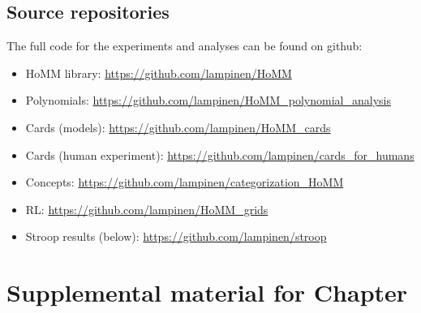 \section{Source repositories}
The full code for the experiments and analyses can be found on github:
\begin{itemize}
\item HoMM library: \url{https://github.com/lampinen/HoMM}
\item Polynomials: \url{https://github.com/lampinen/HoMM_polynomial_analysis}
\item Cards (models): \url{https://github.com/lampinen/HoMM_cards}
\item Cards (human experiment): \url{https://github.com/lampinen/cards_for_humans}
\item Concepts: \url{https://github.com/lampinen/categorization_HoMM}
\item RL: \url{https://github.com/lampinen/HoMM_grids}
\item Stroop results (below): \url{https://github.com/lampinen/stroop}
\end{itemize}





\chapter{Supplemental material for Chapter } \label{appendix:zero_shot_via_homm}

